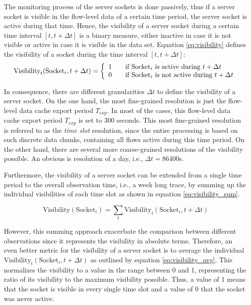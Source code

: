 The monitoring process of the \glspl{server socket} is done passively, thus if a \gls{server socket} is visible in the flow-level data of a certain time period, the \gls{server socket} is active during that time. Hence, the visibility of a \gls{server socket} during a certain time interval $[t,t+\Delta{t}]$ is a binary measure, either inactive in case it is not visible or active in case it is visible in the data set. Equation \ref{eq:visibility} defines the visibility of a socket during the time interval $[t,t+\Delta{t}]$:
\begin{equation}
	\text{Visibility}_t(\text{Socket}_i,t+\Delta{t}) = \left\{
	\begin{array}{l l}
		1 & \quad \text{if $\text{Socket}_i$ is active during $t+\Delta{t}$}\\
		0 & \quad \text{if $\text{Socket}_i$ is not active during $t+\Delta{t}$}\\
	\end{array}
	\right.
	\label{eq:visibility}
\end{equation}

In consequence, there are different granularities $\Delta{t}$ to define the visibility of a \gls{server socket}. On the one hand, the most fine-grained resolution is just the flow-level data cache export period $T_{exp}$. In most of the cases, this flow-level data cache export period $T_{exp}$ is set to 300 seconds. This most fine-grained resolution is referred to as the \emph{time slot} resolution, since the entire processing is based on such discrete data chunks, containing all flows active during this time period. 
On the other hand, there are several more coarse-grained resolutions of the visibility possible. An obvious is resolution of a day, i.e., $\Delta{t} = 86400$s.

Furthermore, the visibility of a \gls{server socket} can be extended from a single time period to the overall observation time, i.e., a week long trace, by summing up the individual visibilities of each time slot as shown in equation \ref{eq:visibility_sum}.

\begin{equation}
	\text{Visibility}(\text{Socket}_i) = \sum_{t} \text{Visibility}_t(\text{Socket}_i,t+\Delta{t})
	\label{eq:visibility_sum}
\end{equation}

However, this summing approach exacerbate the comparison between different observations since it represents the visibility in absolute terms. 
Therefore, an even better metric for the visibility of a \gls{server socket} is to average the individual $\text{Visibility}_t(\text{Socket}_i,t+\Delta{t})$ as outlined by equation \ref{eq:visibility_avg}.
This normalizes the visibility to a value in the range between 0 and 1, representing the ratio of its visibility to the maximum visibility possible. 
Thus, a value of 1 means that the socket is visible in every single time slot and a value of 0 that the socket was never active.

